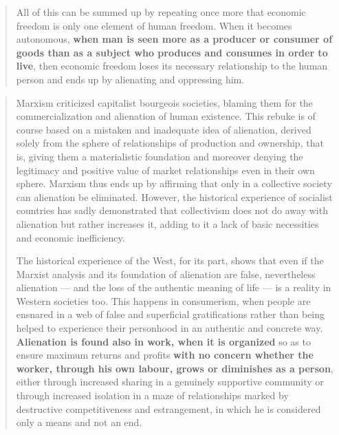 \documentclass[letterpaper]{article}
\begin{document}
\begin{quote}
  All of this can be summed up by repeating once more that economic freedom is only one element of human freedom. When it becomes autonomous, \textbf{when man is seen more as a producer or consumer of goods than as a subject who produces and consumes in order to live}, then economic freedom loses its necessary relationship to the human person and ends up by alienating and oppressing him.
\end{quote}

\begin{quote}
  Marxism criticized capitalist bourgeois societies, blaming them for the commercialization and alienation of human existence. This rebuke is of course based on a mistaken and inadequate idea of alienation, derived solely from the sphere of relationships of production and ownership, that is, giving them a materialistic foundation and moreover denying the legitimacy and positive value of market relationships even in their own sphere. Marxism thus ends up by affirming that only in a collective society can alienation be eliminated. However, the historical experience of socialist countries has sadly demonstrated that collectivism does not do away with alienation but rather increases it, adding to it a lack of basic necessities and economic inefficiency.

  The historical experience of the West, for its part, shows that even if the Marxist analysis and its foundation of alienation are false, nevertheless alienation — and the loss of the authentic meaning of life — is a reality in Western societies too. This happens in consumerism, when people are ensnared in a web of false and superficial gratifications rather than being helped to experience their personhood in an authentic and concrete way. \textbf{Alienation is found also in work, when it is organized} so as to ensure maximum returns and profits \textbf{with no concern whether the worker, through his own labour, grows or diminishes as a person}, either through increased sharing in a genuinely supportive community or through increased isolation in a maze of relationships marked by destructive competitiveness and estrangement, in which he is considered only a means and not an end.


\end{quote}
\end{document}
